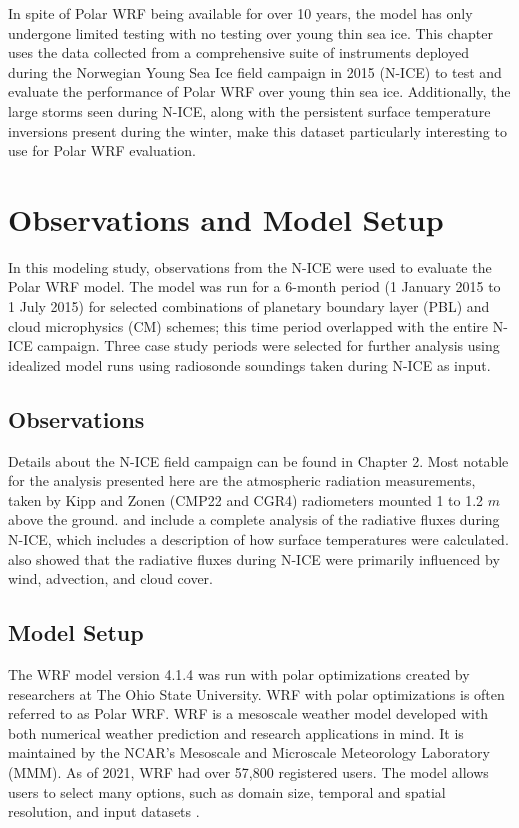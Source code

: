 In spite of Polar WRF being available for over 10 years, the model has only undergone limited testing with no testing over young thin sea ice. This chapter uses the data collected from a comprehensive suite of instruments deployed during the Norwegian Young Sea Ice field campaign in 2015 (N-ICE) to test and evaluate the performance of Polar WRF over young thin sea ice. Additionally, the large storms seen during N-ICE, along with the persistent surface temperature inversions present during the winter, make this dataset particularly interesting to use for Polar WRF evaluation.

\section{Observations and Model Setup}
In this modeling study, observations from the N-ICE were used to evaluate the Polar WRF model. The model was run for a 6-month period (1 January 2015 to 1 July 2015) for selected combinations of planetary boundary layer (PBL) and cloud microphysics (CM) schemes; this time period overlapped with the entire N-ICE campaign. Three case study periods were selected for further analysis using idealized model runs using radiosonde soundings taken during N-ICE as input.

\subsection{Observations}
Details about the N-ICE field campaign can be found in Chapter 2. Most notable for the analysis presented here are the atmospheric radiation measurements, taken by Kipp and Zonen (CMP22 and CGR4) radiometers mounted 1 to 1.2 $m$ above the ground. \citet{granskog:2015} and \citet{walden:2017} include a complete analysis of the radiative fluxes during N-ICE, which includes a description of how surface temperatures were calculated. \citet{walden:2017} also showed that the radiative fluxes during N-ICE were primarily influenced by wind, advection, and cloud cover. 

\subsection{Model Setup}

The WRF model version 4.1.4 was run with polar optimizations created by researchers at The Ohio State University. WRF with polar optimizations is often referred to as Polar WRF. WRF is a mesoscale weather model developed with both numerical weather prediction and research applications in mind. It is maintained by the NCAR's Mesoscale and Microscale Meteorology Laboratory (MMM). As of 2021, WRF had over 57,800 registered users. The model allows users to select many options, such as domain size, temporal and spatial resolution, and input datasets \citep{skamarock:2019}.

